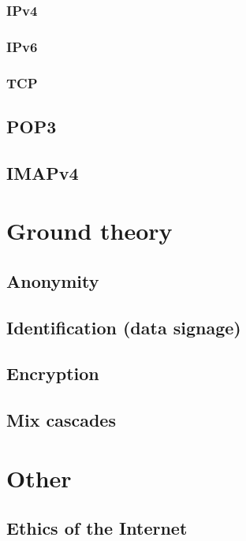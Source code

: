 \documentclass[11pt,a4paper]{book}
\begin{document}
\subsubsection{IPv4}
\cite{RFC760}
\cite{RFC791}
\cite{RFC1180}
\cite{RFC792}
\cite{RFC919}
\cite{RFC922}
\cite{RFC950}
\cite[p.~3]{RFC793}

\subsubsection{IPv6}
\cite{RFC2460}

\subsubsection{TCP}

\subsection{POP3}
\cite{RFC1939}

\subsection{IMAPv4}
\cite{RFC3501}

\section{Ground theory}
\subsection{Anonymity}
\subsection{Identification (data signage)}
\subsection{Encryption}
\subsection{Mix cascades}
\section{Other}
\subsection{Ethics of the Internet}
\cite[p.~1]{RFC1087}
\end{document}
